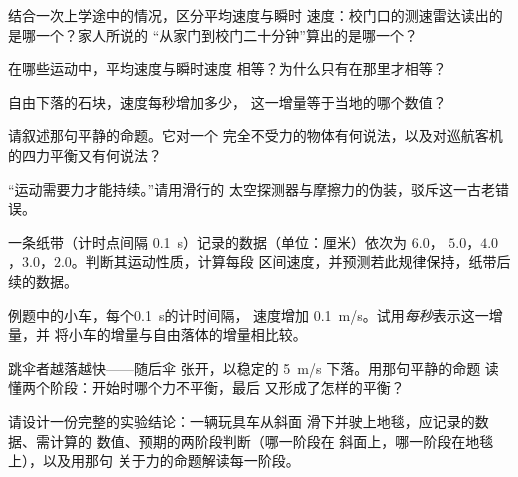 \begin{exercise}[$\star$]\label{exo:g9:uniform-varied-motion:4}
结合一次上学途中的情况，区分平均速度与瞬时
速度：校门口的测速雷达读出的是哪一个？家人所说的
“从家门到校门二十分钟”算出的是哪一个？
\end{exercise}

\begin{exercise}[$\star$]\label{exo:g9:uniform-varied-motion:5}
在哪些运动中，平均速度与瞬时速度
相等？为什么只有在那里才相等？
\end{exercise}

\begin{exercise}[$\star$]\label{exo:g9:uniform-varied-motion:6}
自由下落的石块，速度每秒增加多少，
这一增量等于当地的哪个数值？
\end{exercise}

\begin{exercise}[$\star$]\label{exo:g9:uniform-varied-motion:7}
请叙述那句平静的命题。它对一个
完全不受力的物体有何说法，以及对巡航客机
的四力平衡又有何说法？
\end{exercise}

\begin{exercise}[$\star$]\label{exo:g9:uniform-varied-motion:8}
“运动需要力才能持续。”请用滑行的
太空探测器与摩擦力的伪装，驳斥这一古老错误。
%
\end{exercise}

\begin{exercise}[$\star\star$]\label{exo:g9:uniform-varied-motion:9}
一条纸带（计时点间隔 \qty{0.1}{s}）记录的数据（单位：厘米）依次为 $6.0$，
$5.0$，$4.0$，$3.0$，$2.0$。判断其运动性质，计算每段
区间速度，并预测若此规律保持，纸带后续的数据。
\end{exercise}

\begin{exercise}[$\star\star$]\label{exo:g9:uniform-varied-motion:10}
例题中的小车，每个\qty{0.1}{s}的计时间隔，
速度增加 \qty{0.1}{m/s}。试用\emph{每秒}表示这一增量，并
将小车的增量与自由落体的增量相比较。
\end{exercise}

\begin{exercise}[$\star\star$]\label{exo:g9:uniform-varied-motion:11}
跳伞者越落越快——随后伞
张开，以稳定的 \qty{5}{m/s} 下落。用那句平静的命题
读懂两个阶段：开始时哪个力不平衡，最后
又形成了怎样的平衡？
\end{exercise}

\begin{exercise}[$\star\star\star$]\label{exo:g9:uniform-varied-motion:12}
请设计一份完整的实验结论：一辆玩具车从斜面
滑下并驶上地毯，应记录的数据、需计算的
数值、预期的两阶段判断（哪一阶段在
斜面上，哪一阶段在地毯上），以及用那句
关于力的命题解读每一阶段。
\end{exercise}

